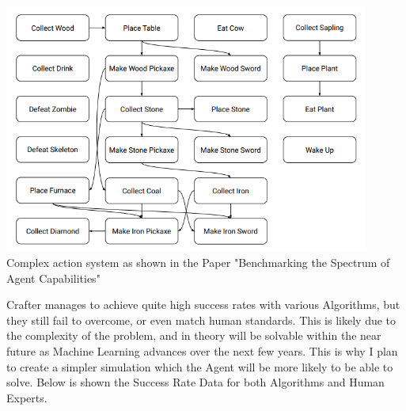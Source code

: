 \begin{flushleft}
\begin{enumerate}
\begin{enumerate}
\begin{enumerate}
                            \vspace{0.2cm}
                            \begin{center}
                                \includegraphics[width=12cm]{Images/InitialResearch/CrafterComplexActionSystem.PNG} \\
                                Complex action system as shown in the Paper "Benchmarking the Spectrum of Agent Capabilities" \\
                            \end{center}
                            \vspace{0.2cm}

                            Crafter manages to achieve quite high success rates with various Algorithms, but they still fail to overcome, or even match
                            human standards. This is likely due to the complexity of the problem, and in theory will be solvable within the near future
                            as Machine Learning advances over the next few years. This is why I plan to create a simpler simulation which the Agent will
                            be more likely to be able to solve. Below is shown the Success Rate Data for both Algorithms and Human Experts. \\


\end{enumerate}
\end{enumerate}
\end{enumerate}
\end{flushleft}
